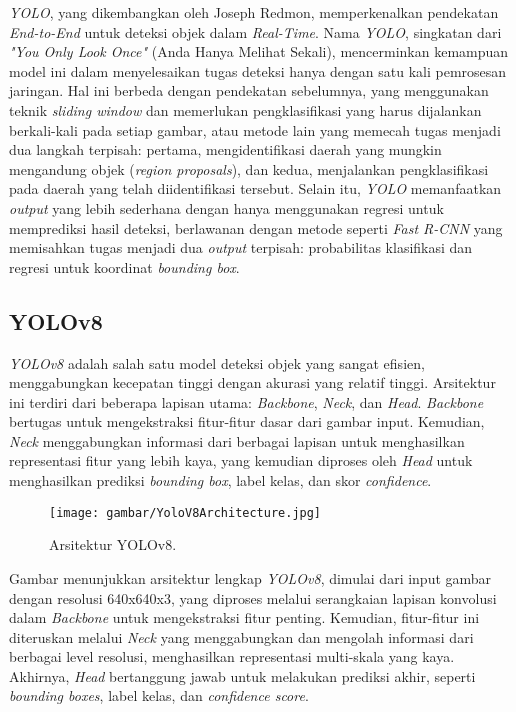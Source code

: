 \emph{YOLO}, yang dikembangkan oleh Joseph Redmon, memperkenalkan pendekatan \emph{End-to-End} untuk deteksi objek dalam \emph{Real-Time}. Nama \emph{YOLO}, singkatan dari \emph{"You Only Look Once"} (Anda Hanya Melihat Sekali), mencerminkan kemampuan model ini dalam menyelesaikan tugas deteksi hanya dengan satu kali pemrosesan jaringan. Hal ini berbeda dengan pendekatan sebelumnya, yang menggunakan teknik \emph{sliding window} dan memerlukan pengklasifikasi yang harus dijalankan berkali-kali pada setiap gambar, atau metode lain yang memecah tugas menjadi dua langkah terpisah: pertama, mengidentifikasi daerah yang mungkin mengandung objek (\emph{region proposals}), dan kedua, menjalankan pengklasifikasi pada daerah yang telah diidentifikasi tersebut. Selain itu, \emph{YOLO} memanfaatkan \emph{output} yang lebih sederhana dengan hanya menggunakan regresi untuk memprediksi hasil deteksi, berlawanan dengan metode seperti \emph{Fast R-CNN} yang memisahkan tugas menjadi dua \emph{output} terpisah: probabilitas klasifikasi dan regresi untuk koordinat \emph{bounding box}.

\subsection{YOLOv8}
\label{subsec:YOLOv8}

\emph{YOLOv8} adalah salah satu model deteksi objek yang sangat efisien, menggabungkan kecepatan tinggi dengan akurasi yang relatif tinggi. Arsitektur ini terdiri dari beberapa lapisan utama: \emph{Backbone}, \emph{Neck}, dan \emph{Head}. \emph{Backbone} bertugas untuk mengekstraksi fitur-fitur dasar dari gambar input. Kemudian, \emph{Neck} menggabungkan informasi dari berbagai lapisan untuk menghasilkan representasi fitur yang lebih kaya, yang kemudian diproses oleh \emph{Head} untuk menghasilkan prediksi \emph{bounding box}, label kelas, dan skor \emph{confidence}.

\begin{figure}[H] 
  \centering 
  \texttt{[image: gambar/YoloV8Architecture.jpg]} 
  \caption{Arsitektur YOLOv8.} 
  \label{fig:ArsitekturYOLOv8} 
\end{figure}

Gambar menunjukkan arsitektur lengkap \emph{YOLOv8}, dimulai dari input gambar dengan resolusi 640x640x3, yang diproses melalui serangkaian lapisan konvolusi dalam \emph{Backbone} untuk mengekstraksi fitur penting. Kemudian, fitur-fitur ini diteruskan melalui \emph{Neck} yang menggabungkan dan mengolah informasi dari berbagai level resolusi, menghasilkan representasi multi-skala yang kaya. Akhirnya, \emph{Head} bertanggung jawab untuk melakukan prediksi akhir, seperti \emph{bounding boxes}, label kelas, dan \emph{confidence score}.

